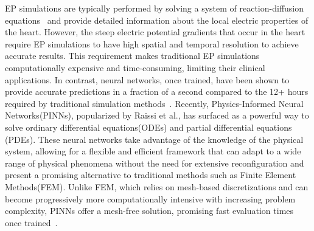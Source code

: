 EP simulations are typically performed by solving a system of reaction-diffusion equations~\cite{R-D-PANFILOV20191} and provide detailed information about the local electric properties of the heart. However, the steep electric potential gradients that occur in the heart require EP simulations to have high spatial and temporal resolution to achieve accurate results. This requirement makes traditional EP simulations computationally expensive and time-consuming, limiting their clinical applications. In contrast, neural networks, once trained, have been shown to provide accurate predictions in a fraction of a second compared to the 12+ hours required by traditional simulation methods~\cite{YinMinglang2023PAND}.
Recently, Physics-Informed Neural Networks(PINNs), popularized by Raissi et al.\cite{RAISSI2019686}, has surfaced as a powerful way to solve ordinary differential equations(ODEs) and partial differential equations (PDEs). These neural networks take advantage of the knowledge of the physical system, allowing for a flexible and efficient framework that can adapt to a wide range of physical phenomena without the need for extensive reconfiguration and present a promising alternative to traditional methods such as Finite Element Methods(FEM). Unlike FEM, which relies on mesh-based discretizations and can become progressively more computationally intensive with increasing problem complexity, PINNs offer a mesh-free solution, promising fast evaluation times once trained~\cite{grossmann2023physicsinformed}.


